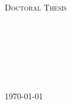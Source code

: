 \documentclass[
11pt, %
english, %
singlespacing, %
headsepline, %
b5paper
]{MastersDoctoralThesis} %
\author{Vasileios \textsc{Syropoulos}} %
\begin{document}
\frontmatter %

\pagestyle{plain} %

\begin{titlepage}
\begin{center}

\textsc{\LARGE \univname}\\[1.5cm] %
\textsc{\Large Doctoral Thesis}\\[0.5cm] %

\HRule \\[0.4cm] %
{\huge \bfseries \ttitle}\\[0.4cm] %
\HRule \\[1.5cm] %

\begin{minipage}{0.4\textwidth}
\begin{center} \large
\href{}{\authorname} %
\end{center}
\end{minipage}\\[3cm]


\groupname\\\deptname\\[2cm] %

{\large \today}\\[4cm] %

\vfill
\end{center}
\end{titlepage}
\end{document}
